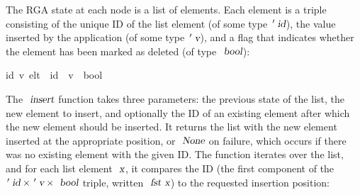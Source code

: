 The RGA state at each node is a list of elements.
Each element is a triple consisting of the unique ID of the list element (of some type $\isacharprime\isa{id}$), the value inserted by the application (of some type $\isacharprime\isa{v}$), and a flag that indicates whether the element has been marked as deleted (of type $\isa{bool}$):
\begin{isabelle}
 {\isacharparenleft}{\isacharprime}id{\isacharcomma}\ {\isacharprime}v{\isacharparenright}\ elt\ {\isacharequal}\ {\isachardoublequoteopen}{\isacharprime}id\ {\isasymtimes}\ {\isacharprime}v\ {\isasymtimes}\ bool{\isachardoublequoteclose}%
\end{isabelle}

The $\isa{insert}$ function takes three parameters: the previous state of the list, the new element to insert, and optionally the ID of an existing element after which the new element should be inserted.
It returns the list with the new element inserted at the appropriate position, or $\isa{None}$ on failure, which occurs if there was no existing element with the given ID.
The function iterates over the list, and for each list element $\isa{x}$, it compares the ID (the first component of the $\isacharprime\isa{id} \mathbin{\isasymtimes} \isacharprime\isa{v} \mathbin{\isasymtimes} \isa{bool}$ triple, written $\isa{fst x}$) to the requested insertion position:
